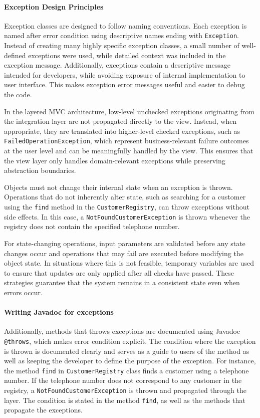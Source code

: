 \documentclass[a4paper]{scrartcl}
\begin{document}
\paragraph{Exception Design Principles}

Exception classes are designed to follow naming conventions. Each exception is named after error condition using descriptive names ending with \texttt{Exception}. Instead of creating many highly specific exception classes, a small number of well-defined exceptions were used, while detailed context was included in the exception message. Additionally, exceptions contain a descriptive message intended for developers, while avoiding exposure of internal implementation to user interface. This makes exception error messages useful and easier to debug the code.

In the layered MVC architecture, low-level unchecked exceptions originating from the integration layer are not propagated directly to the view. Instead, when appropriate, they are translated into higher-level checked exceptions, such as \texttt{FailedOperationException}, which represent business-relevant failure outcomes at the user level and can be meaningfully handled by the view. This ensures that the view layer only handles domain-relevant exceptions while preserving abstraction boundaries.

Objects must not change their internal state when an exception is thrown. Operations that do not inherently alter state, such as searching for a customer using the \texttt{find} method in the \texttt{CustomerRegistry}, can throw exceptions without side effects. In this case, a \texttt{NotFoundCustomerException} is thrown whenever the
registry does not contain the specified telephone number.

For state-changing operations, input parameters are validated before any state changes occur and operations that may fail are executed before modifying the object state. In situations where this is not feasible, temporary variables are used to ensure that updates are only applied after all checks have passed. These strategies guarantee that the system remains in a consistent state even when errors occur.

\paragraph{Writing Javadoc for exceptions}

Additionally, methods that throws exceptions are documented using Javadoc \texttt{@throws}, which makes error condition explicit. The condition where the exception is thrown is documented clearly and serves as a guide to users of the method as well as keeping the developer to define the purpose of the exception. For instance, the method \texttt{find} in \texttt{CustomerRegistry} class finds a customer using a telephone number. If the telephone number does not correspond to any customer in the registry, a \texttt{NotFoundCustomerException} is thrown and propagated through the layer. The condition is stated in the method \texttt{find}, as well as the methods that propagate the exceptions.
\end{document}
